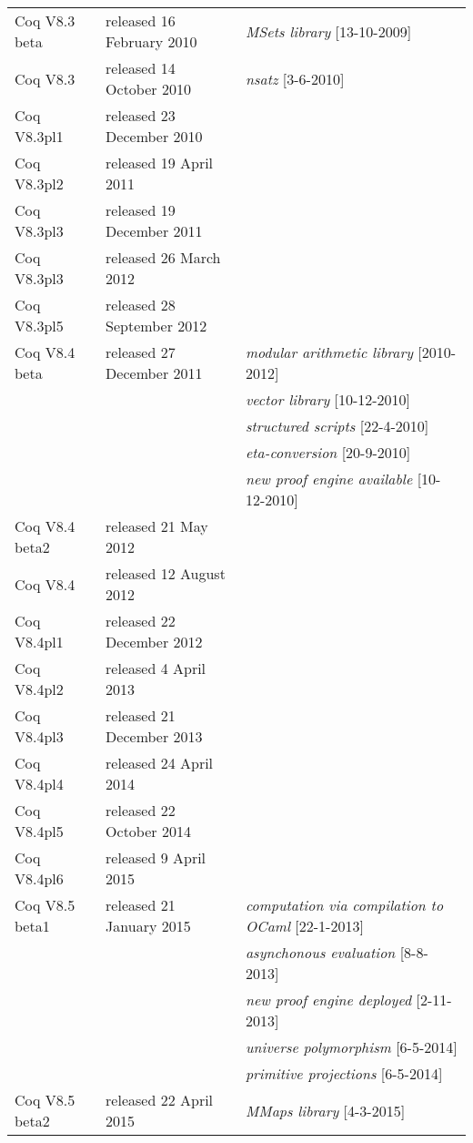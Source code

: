 \documentclass[a4paper]{book}
\newcommand{\feature}[1]{{\em #1}}
\begin{document}
\newpage
\mbox{}\\
\mbox{}\\
\begin{tabular}{l|l|l}
Coq V8.3 beta & released 16 February 2010 & \feature{MSets library} [13-10-2009] \\
Coq V8.3 & released 14 October 2010 & \feature{nsatz} [3-6-2010] \\
Coq V8.3pl1& released 23 December 2010 & \\
Coq V8.3pl2& released 19 April 2011 & \\
Coq V8.3pl3& released 19 December 2011 & \\
Coq V8.3pl3& released 26 March 2012 & \\
Coq V8.3pl5& released 28 September 2012 & \\
Coq V8.4 beta & released 27 December 2011 &  \feature{modular arithmetic library} [2010-2012]\\
&& \feature{vector library} [10-12-2010]\\
&& \feature{structured scripts} [22-4-2010]\\
&& \feature{eta-conversion} [20-9-2010]\\
&& \feature{new proof engine available} [10-12-2010]\\
Coq V8.4 beta2 & released 21 May 2012 & \\
Coq V8.4 & released 12 August 2012 &\\
Coq V8.4pl1& released 22 December 2012 & \\
Coq V8.4pl2& released 4 April 2013 & \\
Coq V8.4pl3& released 21 December 2013 & \\
Coq V8.4pl4& released 24 April 2014 & \\
Coq V8.4pl5& released 22 October 2014 & \\
Coq V8.4pl6& released 9 April 2015 & \\

Coq V8.5 beta1 & released 21 January 2015 & \feature{computation via compilation to OCaml} [22-1-2013]\\
&& \feature{asynchonous evaluation} [8-8-2013]\\
&& \feature{new proof engine deployed} [2-11-2013]\\
&& \feature{universe polymorphism} [6-5-2014]\\
&& \feature{primitive projections} [6-5-2014]\\

Coq V8.5 beta2 & released 22 April 2015 & \feature{MMaps library} [4-3-2015]\\

\end{tabular}
\end{document}

